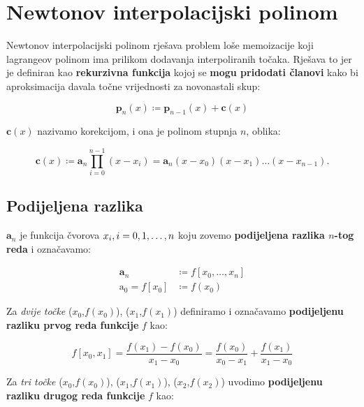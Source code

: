 
\section{Newtonov interpolacijski polinom}

Newtonov interpolacijski polinom rješava problem loše memoizacije koji lagrangeov polinom ima prilikom dodavanja interpoliranih točaka. Rješava to jer je definiran kao \textbf{rekurzivna funkcija} kojoj se \textbf{mogu pridodati članovi} kako bi aproksimacija davala točne vrijednosti za novonastali skup:

\begin{equation}
{\mathbf p}_n(x) \coloneq \mathbf{p}_{n-1}(x) + \mathbf{c}(x)
\end{equation}

${\mathbf c}(x)$ nazivamo korekcijom, i ona je polinom stupnja $n$, oblika:

\begin{equation}
{\mathbf c}(x) \coloneq {\mathbf a}_n\prod_{i=0}^{n-1}(x-x_i) = {\mathbf a}_n(x-x_0)(x-x_1)\dots(x-x_{n-1}).
\end{equation}

\subsection{Podijeljena razlika}

$\mathbf{a}_n$ je funkcija čvorova $x_i,\space i=0, 1, \dots, n$ koju zovemo \textbf{podijeljena razlika $n$-tog reda} i označavamo:

\begin{align*}
\mathbf{a}_n &\coloneq f[x_0,\dots,x_n]\\
\mathrm{a}_0 = f[x_0] &\coloneq f(x_0)
\end{align*}

Za \textit{dvije točke} ($x_0$,$f(x_0)$), ($x_1$,$f(x_1)$) definiramo i označavamo \textbf{podijeljenu razliku prvog reda funkcije} $f$ kao:

$$
f[x_0, x_1] = \frac{f(x_1)-f(x_0)}{x_1 - x_0} = \frac{f(x_0)}{x_0 - x_1} + \frac{f(x_1)}{x_1 - x_0}
$$

Za \textit{tri točke} ($x_0$,$f(x_0)$), ($x_1$,$f(x_1)$), ($x_2$,$f(x_2)$) uvodimo \textbf{podijeljenu razliku drugog reda funkcije} $f$ kao:

